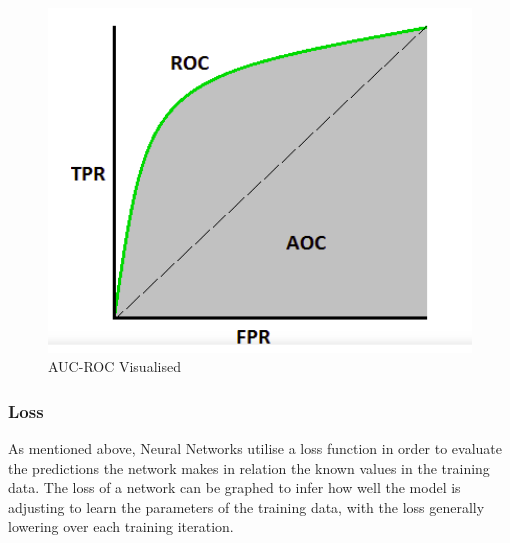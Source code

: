 \documentclass[12pt]{report}
\begin{document}
\vspace{0.5cm}
\begin{figure}[ht!]
	\centering
	\includegraphics[width=12cm]{aucroc}
	\caption{AUC-ROC Visualised}
	\label{fig:aucroc}
\end{figure}

\clearpage
\subsubsection{Loss}
\begin{flushleft}
As mentioned above, Neural Networks utilise a loss function in order to evaluate the predictions the network makes in relation the known values in the training data. The loss of a network can be graphed to infer how well the model is adjusting to learn the parameters of the training data, with the loss generally lowering over each training iteration.
\end{flushleft}
\end{document}

